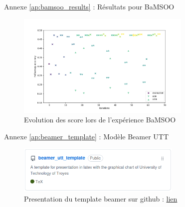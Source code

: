 \begin{frame}{Annexe \ref{ap:bamsoo_results} : Résultats pour BaMSOO}
    \label{ap:bamsoo_results}
    \begin{figure}
        \centering
        \includegraphics[height = 5cm]{assets/imgs/plots/bamsoo/score_evolution.png}
        \caption{Evolution des score lors de l'expérience BaMSOO}
    \end{figure} 
\end{frame}

\begin{frame}{Annexe \ref{ap:beamer_template} : Modèle Beamer UTT}
    \label{ap:beamer_template}
    \begin{figure}
        \centering
        \includegraphics[width = 0.7\textwidth]{assets/annexes/beamer_gh_screenshot.png}
        \caption{Presentation du template beamer sur github : \href{https://github.com/Kiwy3/beamer_utt_template}{lien} }
    \end{figure} 
\end{frame}